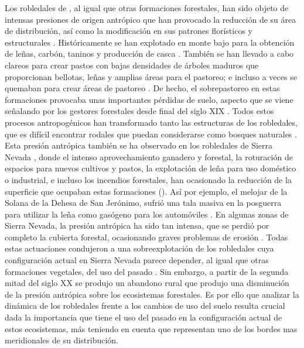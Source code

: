 Los robledales de \Qp, al igual que otras formaciones forestales, han sido objeto de intensas presiones de origen antrópico que han provocado la reducción de su área de distribución, así como la modificación en sus patrones florísticos y estructurales \autocites{Gavilanetal2000EffectsDisturbance,Gavilanetal2007ModellingCurrent,Tarregaetal2006ForestStructure}. Históricamente se han explotado en monte bajo para la obtención de leñas, carbón, taninos y producción de casca \autocite{RuizdelaTorre2006FloraMayor}. También se han llevado a cabo clareos para crear pastos con bajas densidades de árboles maduros que proporcionan bellotas, leñas y amplias áreas para el pastoreo; e incluso a veces se quemaban para crear áreas de pastoreo \autocite{ValbuenaCarabanaGil2017CentenaryCoppicing}. De hecho, el sobrepastoreo en estas formaciones provocaba unas importantes pérdidas de suelo, aspecto que se viene señalando por los gestores forestales desde final del siglo XIX \autocite{Laguna1872ComisionFlora}. Todos estos procesos antropogénicos han transformado tanto las estructuras de los robledales, que es difícil encontrar rodales que puedan considerarse como bosques naturales \autocite{RuizdelaTorre2006FloraMayor}. Esta presión antrópica también se ha observado en los robledales de Sierra Nevada \autocite{JimenezOlivencia1991PaisajesSierra}, donde el intenso aprovechamiento ganadero y forestal, la roturación de espacios para nuevos cultivos y pastos, la explotación de leña para uso doméstico o industrial, e incluso los incendios forestales, han ocasionado la reducción de la superficie que ocupaban estas formaciones \autocite{CamachoOlmedoetal2002AltaAlpujarra} (). Así por ejemplo, el melojar de la Solana de la Dehesa de San Jerónimo, sufrió una tala masiva en la posguerra para utilizar la leña como gasógeno para los automóviles \autocite{Prieto1975BosquesSierra}. En algunas zonas de Sierra Nevada, la presión antrópica ha sido tan intensa, que se perdió por completo la cubierta forestal, ocasionando graves problemas de erosión \autocite{MesaGarrido2019ReforestacionSilvicultura,RomeroZurbano1909DivisionHidrologicoforestal}. Todas estas actuaciones condujeron a una sobreexplotación de los robledales cuya configuración actual en Sierra Nevada parece depender, al igual que otras formaciones vegetales, del uso del pasado \autocite{NavarroGonzalezetal2013WeightLanduse}. Sin embargo, a partir de la segunda mitad del siglo XX se produjo un abandono rural que produjo una disminución de la presión antrópica sobre los ecosistemas forestales. Es por ello que analizar la dinámica de los robledales frente a los cambios de uso del suelo resulta crucial dada la importancia que tiene el uso del pasado en la configuración actual de estos ecosistemas, más teniendo en cuenta que representan uno de los bordes mas meridionales de su distribución. 


